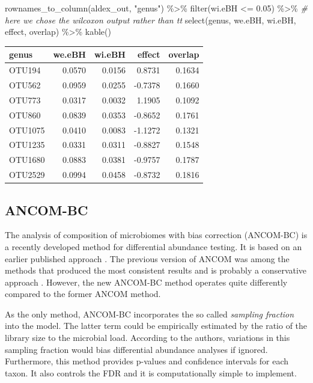 \documentclass[
]{book}
\newenvironment{Shaded}{\begin{snugshade}}{\end{snugshade}}
\newcommand{\CommentTok}[1]{\textcolor[rgb]{0.56,0.35,0.01}{\textit{#1}}}
\newcommand{\FloatTok}[1]{\textcolor[rgb]{0.00,0.00,0.81}{#1}}
\newcommand{\FunctionTok}[1]{\textcolor[rgb]{0.00,0.00,0.00}{#1}}
\newcommand{\NormalTok}[1]{#1}
\newcommand{\SpecialCharTok}[1]{\textcolor[rgb]{0.00,0.00,0.00}{#1}}
\newcommand{\StringTok}[1]{\textcolor[rgb]{0.31,0.60,0.02}{#1}}
\begin{document}
\begin{Shaded}
\begin{Highlighting}[]
\FunctionTok{rownames\_to\_column}\NormalTok{(aldex\_out, }\StringTok{"genus"}\NormalTok{) }\SpecialCharTok{\%\textgreater{}\%}
  \FunctionTok{filter}\NormalTok{(wi.eBH }\SpecialCharTok{\textless{}=} \FloatTok{0.05}\NormalTok{)  }\SpecialCharTok{\%\textgreater{}\%} \CommentTok{\# here we chose the wilcoxon output rather than tt}
  \FunctionTok{select}\NormalTok{(genus, we.eBH, wi.eBH, effect, overlap) }\SpecialCharTok{\%\textgreater{}\%}
  \FunctionTok{kable}\NormalTok{()}
\end{Highlighting}
\end{Shaded}

\begin{tabular}{l|r|r|r|r}
\hline
genus & we.eBH & wi.eBH & effect & overlap\\
\hline
OTU194 & 0.0570 & 0.0156 & 0.8731 & 0.1634\\
\hline
OTU562 & 0.0959 & 0.0255 & -0.7378 & 0.1660\\
\hline
OTU773 & 0.0317 & 0.0032 & 1.1905 & 0.1092\\
\hline
OTU860 & 0.0839 & 0.0353 & -0.8652 & 0.1761\\
\hline
OTU1075 & 0.0410 & 0.0083 & -1.1272 & 0.1321\\
\hline
OTU1235 & 0.0331 & 0.0311 & -0.8827 & 0.1548\\
\hline
OTU1680 & 0.0883 & 0.0381 & -0.9757 & 0.1787\\
\hline
OTU2529 & 0.0994 & 0.0458 & -0.8732 & 0.1816\\
\hline
\end{tabular}

\hypertarget{ancom-bc}{%
\subsection{ANCOM-BC}\label{ancom-bc}}

The analysis of composition of microbiomes with bias correction
(ANCOM-BC) \citep{Das2020} is a recently developed method for differential
abundance testing. It is based on an earlier published approach
\citep{Mandal2015}. The previous version of ANCOM was among the methods
that produced the most consistent results and is probably a
conservative approach \citep{Nearing2022}. However, the new ANCOM-BC
method operates quite differently compared to the former ANCOM method.

As the only method, ANCOM-BC incorporates the so called \emph{sampling
fraction} into the model. The latter term could be empirically
estimated by the ratio of the library size to the microbial
load. According to the authors, variations in this sampling fraction
would bias differential abundance analyses if ignored. Furthermore,
this method provides p-values and confidence intervals for each
taxon. It also controls the FDR and it is computationally simple to
implement.
\end{document}
